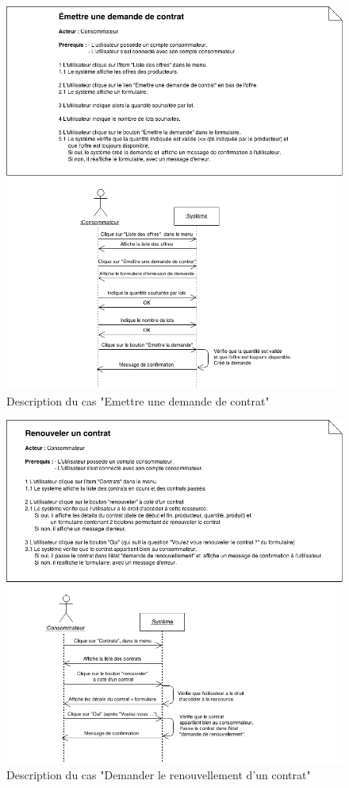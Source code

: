 \documentclass[12pt]{report}
\begin{document}
\begin{figure}[!H]
\centering
\includegraphics[width=1.\textwidth]{./ressources/desc_UC_emettre_demande.png}
\caption{Description du cas "Emettre une demande de contrat"}
\end{figure}
\clearpage

\begin{figure}[!H]
\centering
\includegraphics[width=1.\textwidth]{./ressources/desc_UC_demander_renouvellement.png}
\caption{Description du cas "Demander le renouvellement d'un contrat"}
\end{figure}
\clearpage
\end{document}
